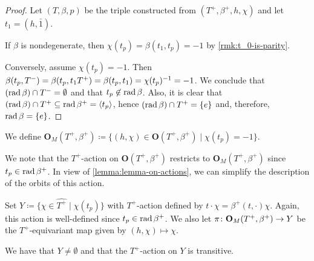 \begin{proof}
    Let $(T, \beta, p)$ be the triple constructed from $(T^+, \beta^+, h, \chi)$ and let $t_1 = (h, \bar 1)$. 
    
    If $\beta$ is nondegenerate, then $\chi(t_p) = \beta(t_1, t_p) = -1$ by \cref{rmk:t_0-is-parity}. 
    
    Conversely, assume $\chi(t_p) = -1$. 
    Then $\beta(t_p, T^-) = \beta(t_p, t_1T^+) = \beta (t_p, t_1) = \chi(t_p)^{-1} = -1$. 
    We conclude that $(\operatorname{rad} \beta)\cap T^- = \emptyset$ and that $t_p \not\in \operatorname{rad}\beta$. 
    Also, it is clear that $(\operatorname{rad} \beta)\cap T^+ \subseteq \operatorname{rad} \beta^+ = \langle t_p \rangle$, hence $(\operatorname{rad} \beta)\cap T^+ = \{e\}$ and, therefore, $\operatorname{rad} \beta = \{e\}$.
\end{proof}

\begin{defi}\label{def:O_M}
    We define $\mathbf{O}_M(T^+, \beta^+) \coloneqq \{ (h, \chi) \in \mathbf{O}(T^+, \beta^+) \mid \chi(t_p) = -1 \}$.
\end{defi}



We note that the $T^+$-action on $\mathbf{O}(T^+, \beta^+)$ restricts to $\mathbf{O}_M(T^+, \beta^+)$ since $t_p\in \operatorname{rad} \beta^+$. 
In view of \cref{lemma:lemma-on-actions}, we can simplify the description of the orbits of this action. 

Set $Y \coloneqq \{\chi \in \widehat{T^+} \mid \chi (t_p)\}$ with $T^+$-action defined by $t\cdot \chi = \beta^+(t, \cdot) \chi$. 
Again, this action is well-defined since $t_p \in \operatorname{rad} \beta^+$. 
We also let $\pi\colon \mathbf{O}_M(T^+, \beta^+) \to Y$ be the $T^+$-equivariant map given by $(h, \chi) \mapsto \chi$. 

\begin{lemma}
    We have that $Y \neq \emptyset$ and that the $T^+$-action on $Y$ is transitive.
\end{lemma}

